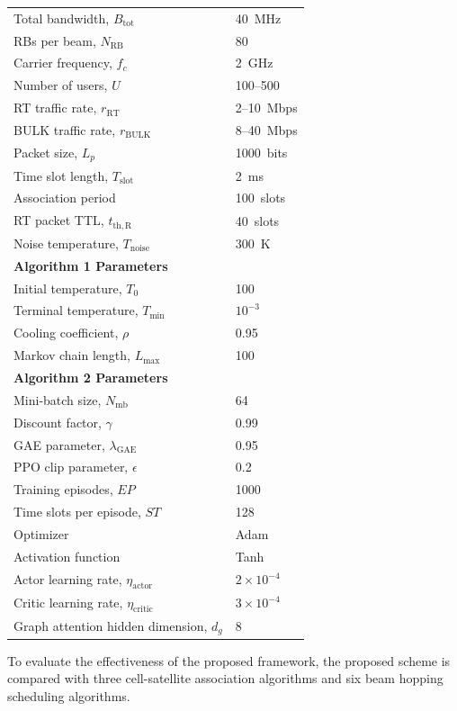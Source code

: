 \documentclass[journal]{IEEEtran}
\newcommand{\revend}[1]{\color{black}\ignorespaces}
\begin{document}
\begin{table}[t]
\begin{tabular}{l|l}
Total bandwidth, $B_{\mathrm{tot}}$ & 40~MHz \\
RBs per beam, $N_{\mathrm{RB}}$ & 80 \\
Carrier frequency, $f_c$ & 2~GHz \\
Number of users, $U$ & 100--500 \\
RT traffic rate, $r_{\mathrm{RT}}$ & 2--10~Mbps \\
BULK traffic rate, $r_{\mathrm{BULK}}$ & 8--40~Mbps \\
Packet size, $L_p$ & 1000~bits \\
Time slot length, $T_{\mathrm{slot}}$ & 2~ms \\
Association period & 100~slots \\
RT packet TTL, $t_{\mathrm{th},\mathrm{R}}$ & 40~slots \\
Noise temperature, $T_{\mathrm{noise}}$ & 300~K \\
\hline
\multicolumn{2}{l}{\textbf{Algorithm 1 Parameters}} \\
Initial temperature, $T_0$ & 100 \\
Terminal temperature, $T_{\min}$ & $10^{-3}$ \\
Cooling coefficient, $\rho$ & 0.95 \\
Markov chain length, $L_{\max}$ & 100 \\
\hline
\multicolumn{2}{l}{\textbf{Algorithm 2 Parameters}} \\
Mini-batch size, $N_{\mathrm{mb}}$ & 64 \\
Discount factor, $\gamma$ & 0.99 \\
GAE parameter, $\lambda_{\mathrm{GAE}}$ & 0.95 \\
PPO clip parameter, $\epsilon$ & 0.2 \\
Training episodes, $EP$ & 1000 \\
Time slots per episode, $ST$ & 128 \\
Optimizer & Adam \\
Activation function & Tanh \\
Actor learning rate, $\eta_{\mathrm{actor}}$ & $2\times10^{-4}$ \\
Critic learning rate, $\eta_{\mathrm{critic}}$ & $3\times10^{-4}$ \\
Graph attention hidden dimension, $d_g$ & 8 \\
\hline
\end{tabular}
\revend{}
\end{table}

To evaluate the effectiveness of the proposed framework, the proposed scheme is compared with three cell-satellite association algorithms and six beam hopping scheduling algorithms. 
\end{document}
